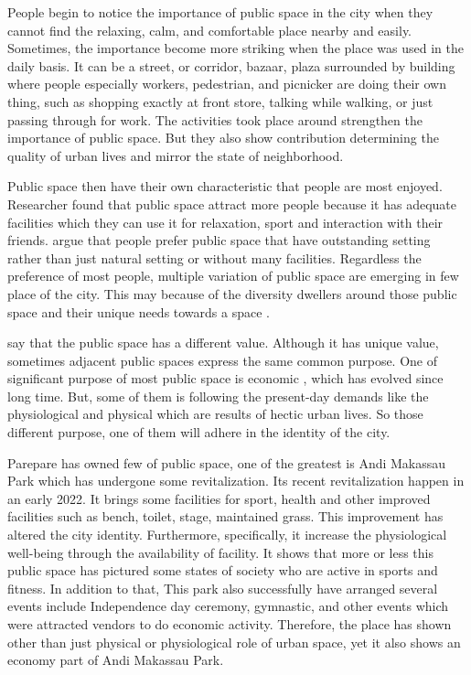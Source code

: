 \documentclass[11pt]{simart} %
\begin{document}
People begin to notice the importance of public space in the city when they cannot find the relaxing, calm, and comfortable place nearby and easily. Sometimes, the importance become more striking when the place was used in the daily basis. It can be a street, or corridor, bazaar, plaza surrounded by building where people especially workers, pedestrian, and picnicker are doing their own thing, such as shopping exactly at front store, talking while walking, or just passing through for work.
The activities took place around strengthen the importance of public space. But they also show contribution determining the quality of urban lives and mirror the state of neighborhood.

Public space then have their own characteristic that people are most enjoyed. Researcher found that public space attract more people because it has adequate facilities which they can use it for relaxation, sport and interaction with their friends.
\cite{uliah} argue that people prefer public space that have outstanding setting rather than just natural setting or without many facilities. Regardless the preference of most people, multiple variation of public space are emerging in few place of the city.
This may because of the diversity dwellers around those public space and their unique needs towards a space \citep{ahmadi2009}.

\cite{ahmadi2009} say that the public space has a different value. Although it has unique value, sometimes adjacent public spaces express the same common purpose. One of significant purpose of most public space is economic \citep{akkar2007}, which has evolved since long time. But, some of them is following the present-day demands like the physiological and physical which are results of hectic urban lives. So those different purpose, one of them will adhere in the identity of the city.

Parepare has owned few of public space, one of the greatest is Andi Makassau Park which has undergone some revitalization. Its recent revitalization happen in an early 2022. It brings some facilities for sport, health and other improved facilities such as bench, toilet, stage, maintained grass.
This improvement has altered the city identity. Furthermore, specifically, it increase the physiological well-being through the availability of facility. It shows that more or less this public space has pictured some states of society who are active in sports and fitness. In addition to that, This park also successfully have arranged several events include Independence day ceremony, gymnastic, and other events which were attracted vendors to do economic activity. Therefore, the place has shown other than just physical or physiological role of urban space, yet it also shows an economy part of Andi Makassau Park.
\end{document}
